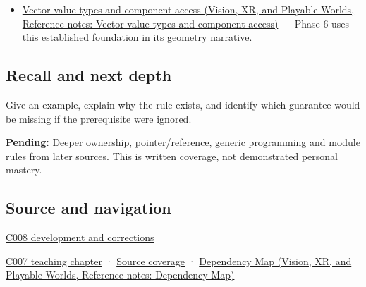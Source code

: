 \hypertarget{appendix-3f7e15effba6-used-by}{}

\begin{itemize}
\tightlist
\item
  \href{../07-Vision-XR-and-Playable-Worlds/main.pdf\#nameddest=appendix-37a39984ba66}{Vector value types and component access (Vision, XR, and Playable Worlds, Reference notes: Vector value types and component access)} --- Phase 6 uses this established foundation in its geometry narrative.
\end{itemize}

\subsection{Recall and next depth}\label{appendix-3f7e15effba6-recall-and-next-depth}

\hypertarget{appendix-3f7e15effba6-recall-and-next-depth}{}

Give an example, explain why the rule exists, and identify which guarantee would be missing if the prerequisite were ignored.

\textbf{Pending:} Deeper ownership, pointer/reference, generic programming and module rules from later sources. This is written coverage, not demonstrated personal mastery.

\subsection{Source and navigation}\label{appendix-3f7e15effba6-source-and-navigation}

\hypertarget{appendix-3f7e15effba6-source-and-navigation}{}

\hyperref[appendix-fd090d982a15-m008---parts-113-126]{C008 development and corrections}

\hyperref[01-foundations-i-ch003-bringing-the-object-model-back-to-bytes]{C007 teaching chapter} · \hyperref[appendix-fd090d982a15-m007---parts-101-112]{Source coverage} · \href{../07-Vision-XR-and-Playable-Worlds/main.pdf\#nameddest=appendix-4ad47bdd269a}{Dependency Map (Vision, XR, and Playable Worlds, Reference notes: Dependency Map)}

